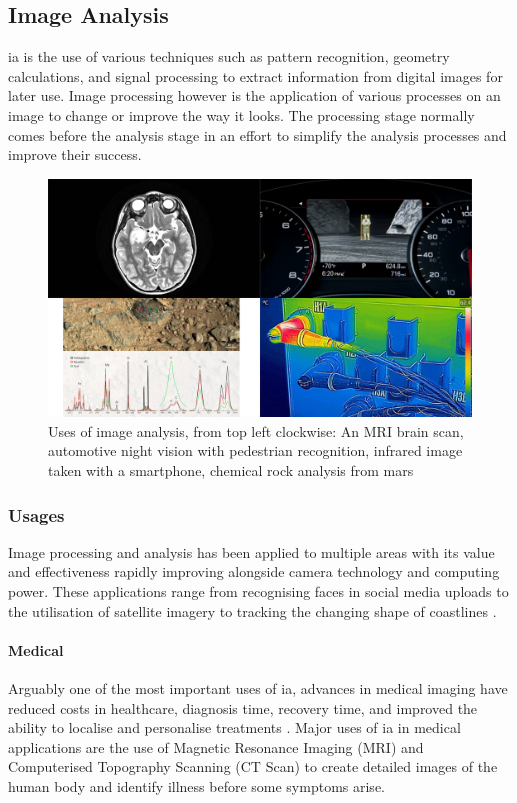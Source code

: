 \subsection{Image Analysis}
	\gls{ia} is the use of various techniques such as pattern recognition, geometry calculations, and signal processing to extract information from digital images for later use. Image processing however is the application of various processes on an image to change or improve the way it looks. The processing stage normally comes before the analysis stage in an effort to simplify the analysis processes and improve their success.
	\begin{figure}[h!]
		\centering
		\includegraphics[width=15cm]{../images/4panel.png}
		\caption{Uses of image analysis, from top left clockwise: An MRI brain scan, automotive night vision with pedestrian recognition, infrared image taken with a smartphone, chemical rock analysis from mars}			
		\label{fig:curiosity}
	\end{figure}
	\subsubsection{Usages}
	Image processing and analysis has been applied to multiple areas with its value and effectiveness rapidly improving alongside camera technology and computing power. These applications range from recognising faces in social media uploads \citep{zuckerberg2011tagging} to the utilisation of satellite imagery to tracking the changing shape of coastlines \citep{costalimagery}.
	\paragraph{Medical}
	Arguably one of the most important uses of \gls{ia}, advances in medical imaging have reduced costs in healthcare, diagnosis time, recovery time, and improved the ability to localise and personalise treatments \citep{esfmedical}. Major uses of \gls{ia} in medical applications are the use of Magnetic Resonance Imaging (MRI) and Computerised Topography Scanning (CT Scan) to create detailed images of the human body and identify illness before some symptoms arise.
